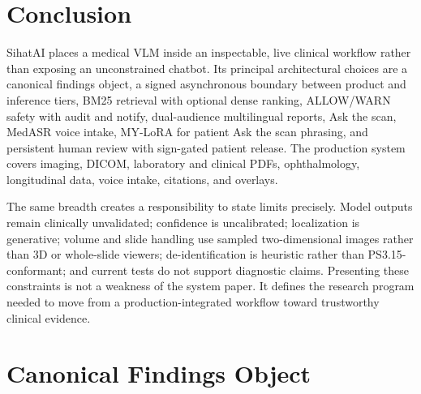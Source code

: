 \documentclass[conference]{IEEEtran}
\begin{document}
\section{Conclusion}

SihatAI places a medical VLM inside an inspectable, live clinical workflow rather than exposing an unconstrained chatbot. Its principal architectural choices are a canonical findings object, a signed asynchronous boundary between product and inference tiers, BM25 retrieval with optional dense ranking, ALLOW/WARN safety with audit and notify, dual-audience multilingual reports, Ask the scan, MedASR voice intake, MY-LoRA for patient Ask the scan phrasing, and persistent human review with sign-gated patient release. The production system covers imaging, DICOM, laboratory and clinical PDFs, ophthalmology, longitudinal data, voice intake, citations, and overlays.

The same breadth creates a responsibility to state limits precisely. Model outputs remain clinically unvalidated; confidence is uncalibrated; localization is generative; volume and slide handling use sampled two-dimensional images rather than 3D or whole-slide viewers; de-identification is heuristic rather than PS3.15-conformant; and current tests do not support diagnostic claims. Presenting these constraints is not a weakness of the system paper. It defines the research program needed to move from a production-integrated workflow toward trustworthy clinical evidence.

\appendices

\section{Canonical Findings Object}
\end{document}

